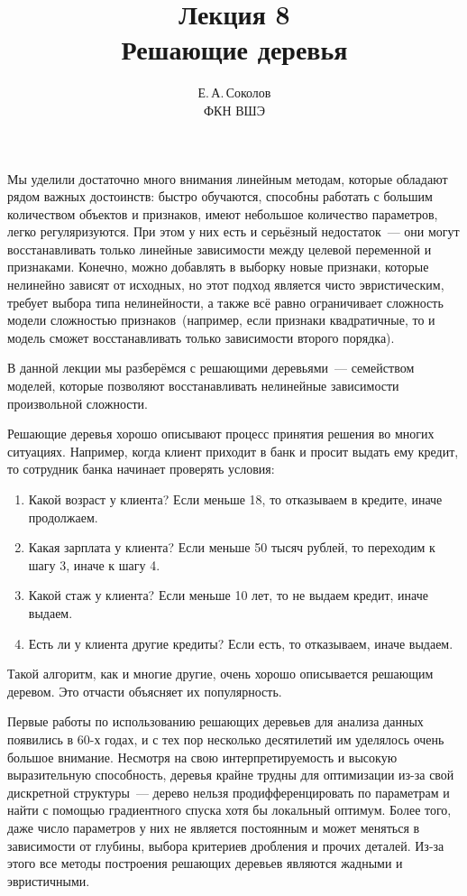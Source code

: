 \documentclass[12pt,fleqn]{article}
\begin{document}
\title{Лекция 8\\Решающие деревья}
\author{Е.\,А.\,Соколов\\ФКН ВШЭ}
\maketitle

Мы уделили достаточно много внимания линейным методам, которые обладают рядом важных достоинств:
быстро обучаются, способны работать с большим количеством объектов и признаков,
имеют небольшое количество параметров, легко регуляризуются.
При этом у них есть и серьёзный недостаток~--- они могут восстанавливать только
линейные зависимости между целевой переменной и признаками.
Конечно, можно добавлять в выборку новые признаки, которые нелинейно зависят от исходных,
но этот подход является чисто эвристическим, требует выбора типа нелинейности,
а также всё равно ограничивает сложность модели сложностью признаков~(например,
если признаки квадратичные, то и модель сможет восстанавливать только зависимости второго порядка).

В данной лекции мы разберёмся с решающими деревьями~--- семейством моделей, которые позволяют восстанавливать нелинейные зависимости
произвольной сложности.

Решающие деревья хорошо описывают процесс принятия решения во многих ситуациях.
Например, когда клиент приходит в банк и просит выдать ему кредит, то сотрудник банка
начинает проверять условия:
\begin{enumerate}
    \item Какой возраст у клиента? Если меньше 18, то отказываем в кредите, иначе продолжаем.
    \item Какая зарплата у клиента? Если меньше 50 тысяч рублей, то переходим к шагу 3, иначе к шагу 4.
    \item Какой стаж у клиента? Если меньше 10 лет, то не выдаем кредит, иначе выдаем.
    \item Есть ли у клиента другие кредиты? Если есть, то отказываем, иначе выдаем.
\end{enumerate}
Такой алгоритм, как и многие другие, очень хорошо описывается решающим деревом.
Это отчасти объясняет их популярность.

Первые работы по использованию решающих деревьев для анализа данных появились в 60-х годах,
и с тех пор несколько десятилетий им уделялось очень большое внимание.
Несмотря на свою интерпретируемость и высокую выразительную способность,
деревья крайне трудны для оптимизации из-за свой дискретной структуры~---
дерево нельзя продифференцировать по параметрам и найти с помощью градиентного спуска
хотя бы локальный оптимум.
Более того, даже число параметров у них не является постоянным и может меняться в зависимости
от глубины, выбора критериев дробления и прочих деталей.
Из-за этого все методы построения решающих деревьев являются жадными и эвристичными.
\end{document}
